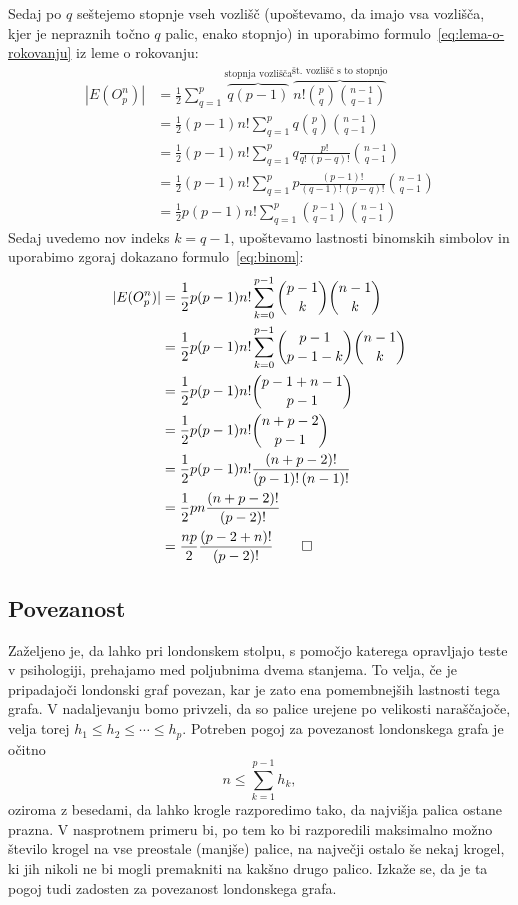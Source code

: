 \documentclass[12pt,a4paper]{amsart}
\theoremstyle{definition} %
\theoremstyle{plain} %
\begin{document}
    Sedaj po $q$ seštejemo stopnje vseh vozlišč (upoštevamo, da imajo vsa vozlišča, kjer je nepraznih točno $q$ palic, enako stopnjo) in uporabimo formulo~\eqref{eq:lema-o-rokovanju} iz leme o rokovanju:
    \begin{align*}
        |E(O^n_p)|
        &= \frac{1}{2} \sum_{q=1}^{p} \overbrace{q(p-1)}^{\text{stopnja vozlišča}} 
        \overbrace{n! {p \choose q} {n-1 \choose q-1} }^{\text{št.~vozlišč s to stopnjo}} \\
        &= \frac{1}{2} (p-1) n! \sum_{q=1}^{p} q {p \choose q} {n-1 \choose q-1} \\
        &= \frac{1}{2} (p-1) n! \sum_{q=1}^{p} q \frac{p!}{q! \, (p-q)!} {n-1 \choose q-1} \\
        &= \frac{1}{2} (p-1) n! \sum_{q=1}^{p} p \frac{(p-1)!}{(q-1)! \, (p-q)!} {n-1 \choose q-1} \\
        &= \frac{1}{2} p (p-1) n! \sum_{q=1}^{p} {p-1 \choose q-1} {n-1 \choose q-1}
    \end{align*}
    Sedaj uvedemo nov indeks $k = q-1$, upoštevamo lastnosti binomskih simbolov in uporabimo zgoraj dokazano formulo~\eqref{eq:binom}:
    \begin{align*}
        |E(O^n_p)|
        &= \frac{1}{2} p (p-1) n! \sum_{k=0}^{p-1} {p-1 \choose k} {n-1 \choose k} \\
        &= \frac{1}{2} p (p-1) n! \sum_{k=0}^{p-1} {p-1 \choose p-1-k} {n-1 \choose k} \\
        &= \frac{1}{2} p (p-1) n! {p-1 + n-1 \choose p-1} \\
        &= \frac{1}{2} p (p-1) n! {n + p - 2 \choose p-1} \\
        &= \frac{1}{2} p (p-1) n! \frac{(n+p-2)!}{(p-1)!\,(n-1)!} \\
        &= \frac{1}{2} p n \frac{(n+p-2)!}{(p-2)!} \\
        &= \frac{np}{2} \frac{(p-2+n)!}{(p-2)!} \qedhere
    \end{align*}
\endproof

\subsection{Povezanost}

Zaželjeno je, da lahko pri londonskem stolpu, s pomočjo katerega opravljajo teste v psihologiji, prehajamo med poljubnima dvema stanjema. To velja, če je pripadajoči londonski graf povezan, kar je zato ena pomembnejših lastnosti tega grafa.
V nadaljevanju bomo privzeli, da so palice urejene po velikosti naraščajoče, velja torej $h_1 \leq h_2 \leq \cdots \leq h_p$.
Potreben pogoj za povezanost londonskega grafa je očitno 
\[ n \leq \sum_{k=1}^{p-1} h_k, \]
oziroma z besedami, da lahko krogle razporedimo tako, da najvišja palica ostane prazna. V nasprotnem primeru bi, po tem ko bi razporedili maksimalno možno število krogel na vse preostale (manjše) palice, na največji ostalo še nekaj krogel, ki jih nikoli ne bi mogli premakniti na kakšno drugo palico.
Izkaže se, da je ta pogoj tudi zadosten za povezanost londonskega grafa.
\end{document}
